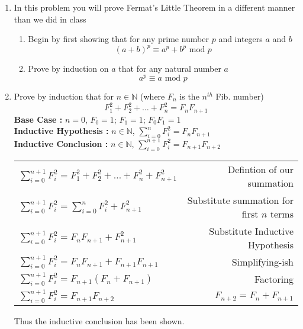 \documentclass[a4paper,11pt]{article}
\begin{document}
\begin{enumerate}
\item In this problem you will prove Fermat’s Little Theorem in a different manner than we did in
class

\begin{enumerate}
\item Begin by first showing that for any prime number $p$ and integers $a$ and $b$
$$ (a+b)^p \equiv a^p + b^p \text{ mod } p$$

\item Prove by induction on $a$ that for any natural number $a$
$$ a^p \equiv a \text{ mod } p$$
\end{enumerate}


\item Prove by induction that for $n \in \mathbb{N}$ (where $F_n$ is the $n^{th}$ Fib. number)
$$ F_1^2 + F_2^2 + \ldots + F_n^2 = F_nF_{n+1}$$
\textbf{ Base Case : } $n = 0$, $ F_0 = 1$; $F_1 = 1$; $F_0F_1 = 1$ \\[.1in]
\textbf{ Inductive Hypothesis : } $n \in \mathbb{N}$,  $\sum_{i=0}^{n} F_i^2 = F_nF_{n+1}$ \\[.1in]
\textbf{ Inductive Conclusion : } $n \in \mathbb{N}$,  $\sum_{i=0}^{n+1} F_i^2 = F_{n+1}F_{n+2}$ \\[.1in]
\begin{tabular}{l | r}
$\sum_{i=0}^{n+1} F_i^2 =  F_1^2 + F_2^2 + \ldots + F_n^2 + F_{n+1}^2 $    & Defintion of our summation \\
$\sum_{i=0}^{n+1} F_i^2 =  \sum_{i=0}^{n} F_i^2  + F_{n+1}^2 $	   		   & Substitute summation for first $n$ terms  \\
$\sum_{i=0}^{n+1} F_i^2 =  F_nF_{n+1}  + F_{n+1}^2 $	   		   		   & Substitute Inductive Hypothesis  \\
$\sum_{i=0}^{n+1} F_i^2 =  F_nF_{n+1}  + F_{n+1}F_{n+1} $	   		   	   & Simplifying-ish  \\
$\sum_{i=0}^{n+1} F_i^2 =  F_{n+1}(F_{n}  + F_{n+1}) $	   		   		   & Factoring  \\
$\sum_{i=0}^{n+1} F_i^2 =  F_{n+1}F_{n+2} $	   		   		  			   & $F_{n+2} = F_n + F_{n+1}$  \\
\end{tabular}
Thus the inductive conclusion has been shown.






\end{enumerate}
\end{document}
